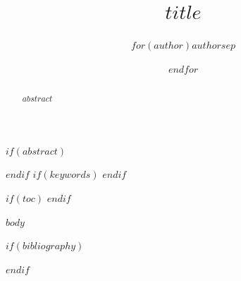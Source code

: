 \documentclass[$if(fontsize)$$fontsize$,$endif$]{llncs}
\title{$title$}
\author{$for(author)$$author$$sep$ \and $endfor$}
\institute{$institute$}
\begin{document}
\maketitle

$if(abstract)$
\begin{abstract}
$abstract$
\end{abstract}
$endif$
$if(keywords)$
$endif$

$if(toc)$
\tableofcontents
$endif$

$body$

$if(bibliography)$


$endif$
\end{document}
